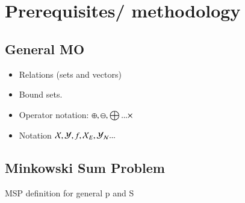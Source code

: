 

\section{Prerequisites/ methodology}

\subsection{General MO}
\begin{itemize}
	\item Relations (sets and vectors)
	\item Bound sets.
	\item Operator notation: $\oplus , \ominus , \bigoplus... \times$
	\item Notation $\mathcal{X}, \mathcal{Y}, f, \mathcal{X}_E, \mathcal{Y}_{\mathcal{N}}...$
\end{itemize}


\subsection{Minkowski Sum Problem}
MSP definition for general p and S


